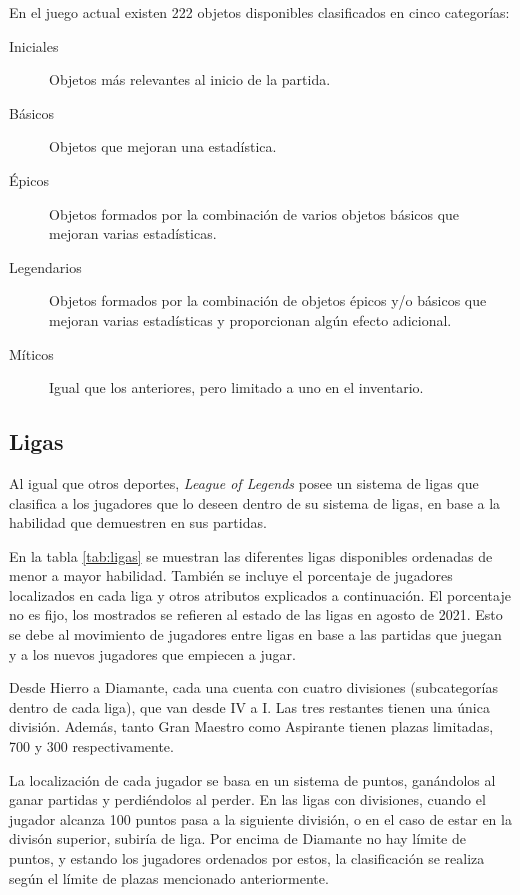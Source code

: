 En el juego actual existen 222 objetos disponibles clasificados en cinco categorías:
\begin{description}
	\item[Iniciales] Objetos más relevantes al inicio de la partida.
	\item[Básicos] Objetos que mejoran una estadística.
	\item[Épicos] Objetos formados por la combinación de varios objetos básicos que mejoran varias estadísticas.
	\item[Legendarios] Objetos formados por la combinación de objetos épicos y/o básicos que mejoran varias estadísticas y proporcionan algún efecto adicional.
	\item[Míticos] Igual que los anteriores, pero limitado a uno en el inventario.
\end{description}

\subsection{Ligas}
Al igual que otros deportes, \textit{League of Legends} posee un sistema de ligas que clasifica a los jugadores que lo deseen dentro de su sistema de ligas, en base a la habilidad que demuestren en sus partidas.

En la tabla \ref{tab:ligas} se muestran las diferentes ligas disponibles ordenadas de menor a mayor habilidad. También se incluye el porcentaje de jugadores localizados en cada liga\cite{misc:player-distribution} y otros atributos explicados a continuación. El porcentaje no es fijo, los mostrados se refieren al estado de las ligas en agosto de 2021. Esto se debe al movimiento de jugadores entre ligas en base a las partidas que juegan y a los nuevos jugadores que empiecen a jugar.

Desde Hierro a Diamante, cada una cuenta con cuatro divisiones (subcategorías dentro de cada liga), que van desde IV a I. Las tres restantes tienen una única división. Además, tanto Gran Maestro como Aspirante tienen plazas limitadas, 700 y 300 respectivamente.

La localización de cada jugador se basa en un sistema de puntos, ganándolos al ganar partidas y perdiéndolos al perder. En las ligas con divisiones, cuando el jugador alcanza 100 puntos pasa a la siguiente división, o en el caso de estar en la divisón superior, subiría de liga. Por encima de Diamante no hay límite de puntos, y estando los jugadores ordenados por estos, la clasificación se realiza según el límite de plazas mencionado anteriormente.

